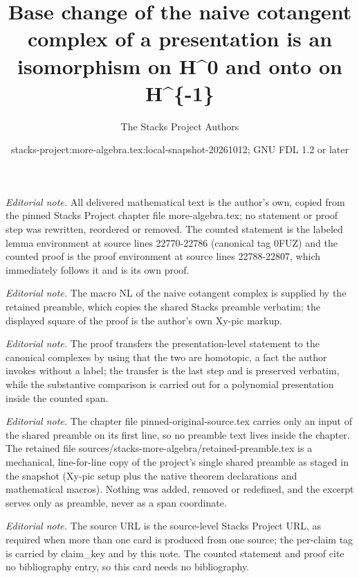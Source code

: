 \documentclass[10pt,a4paper]{amsart}
\title{Base change of the naive cotangent complex of a presentation is an isomorphism on H\textasciicircum{}0 and onto on H\textasciicircum{}\{-1\}}
\author{The Stacks Project Authors}
\date{stacks-project:more-algebra.tex:local-snapshot-20261012; GNU FDL 1.2 or later}
\theoremstyle{plain}
\theoremstyle{definition}
\theoremstyle{remark}
\numberwithin{equation}{subsection}
\begin{document}
\maketitle
\setcounter{subsection}{1}
\noindent\textit{Editorial note.} All delivered mathematical text is the author's own, copied from the pinned Stacks Project chapter file more-algebra.tex; no statement or proof step was rewritten, reordered or removed. The counted statement is the labeled lemma environment at source lines 22770-22786 (canonical tag 0FUZ) and the counted proof is the proof environment at source lines 22788-22807, which immediately follows it and is its own proof.\par\medskip
\noindent\textit{Editorial note.} The macro NL of the naive cotangent complex is supplied by the retained preamble, which copies the shared Stacks preamble verbatim; the displayed square of the proof is the author's own Xy-pic markup.\par\medskip
\noindent\textit{Editorial note.} The proof transfers the presentation-level statement to the canonical complexes by using that the two are homotopic, a fact the author invokes without a label; the transfer is the last step and is preserved verbatim, while the substantive comparison is carried out for a polynomial presentation inside the counted span.\par\medskip
\noindent\textit{Editorial note.} The chapter file pinned-original-source.tex carries only an input of the shared preamble on its first line, so no preamble text lives inside the chapter. The retained file sources/stacks-more-algebra/retained-preamble.tex is a mechanical, line-for-line copy of the project's single shared preamble as staged in the snapshot (Xy-pic setup plus the native theorem declarations and mathematical macros). Nothing was added, removed or redefined, and the excerpt serves only as preamble, never as a span coordinate.\par\medskip
\noindent\textit{Editorial note.} The source URL is the source-level Stacks Project URL, as required when more than one card is produced from one source; the per-claim tag is carried by claim\_key and by this note. The counted statement and proof cite no bibliography entry, so this card needs no bibliography.\par\medskip
\end{document}
